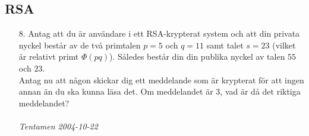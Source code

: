 \documentclass{article}
\begin{document}
\subsection*{RSA}
\begin{enumerate}

\item[8.]
Antag att du är användare i ett RSA-krypterat system och att din privata 
nyckel består av de två primtalen $p=5$ och $q=11$ samt talet $s=23$ 
(vilket är relativt primt $\Phi (pq)$). Således består din din publika nyckel 
av talen $55$ och $23$.\\
Antag nu att någon skickar dig ett meddelande som är krypterat för att ingen 
annan än du ska kunna läsa det. Om meddelandet är 3, vad är då det riktiga 
meddelandet?
\\ \\{\it Tentamen 2004-10-22}

\end{enumerate}
\end{document}
